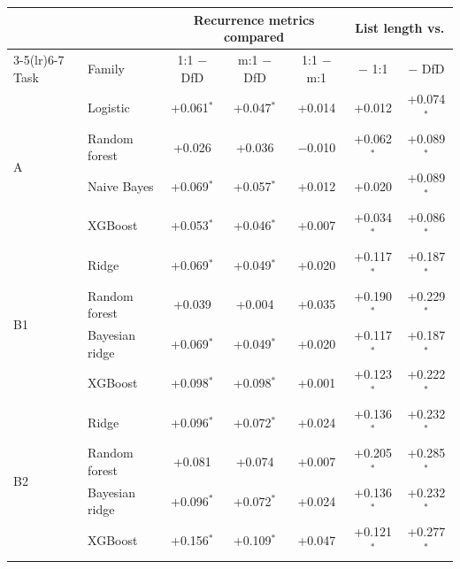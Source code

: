 \begin{tabular}{llccccc}
\toprule
 & & \multicolumn{3}{c}{Recurrence metrics compared} & \multicolumn{2}{c}{List length vs.} \\
\cmidrule(lr){3-5}\cmidrule(lr){6-7}
Task & Family & 1:1 $-$ DfD & m:1 $-$ DfD & 1:1 $-$ m:1 & $-$ 1:1 & $-$ DfD \\
\midrule
\multirow{4}{*}{A} & Logistic & +0.061$^{*}$ & +0.047$^{*}$ & +0.014 & +0.012 & +0.074$^{*}$ \\
 & Random forest & +0.026 & +0.036 & $-$0.010 & +0.062$^{*}$ & +0.089$^{*}$ \\
 & Naive Bayes & +0.069$^{*}$ & +0.057$^{*}$ & +0.012 & +0.020 & +0.089$^{*}$ \\
 & XGBoost & +0.053$^{*}$ & +0.046$^{*}$ & +0.007 & +0.034$^{*}$ & +0.086$^{*}$ \\
\midrule
\multirow{4}{*}{B1} & Ridge & +0.069$^{*}$ & +0.049$^{*}$ & +0.020 & +0.117$^{*}$ & +0.187$^{*}$ \\
 & Random forest & +0.039 & +0.004 & +0.035 & +0.190$^{*}$ & +0.229$^{*}$ \\
 & Bayesian ridge & +0.069$^{*}$ & +0.049$^{*}$ & +0.020 & +0.117$^{*}$ & +0.187$^{*}$ \\
 & XGBoost & +0.098$^{*}$ & +0.098$^{*}$ & +0.001 & +0.123$^{*}$ & +0.222$^{*}$ \\
\midrule
\multirow{4}{*}{B2} & Ridge & +0.096$^{*}$ & +0.072$^{*}$ & +0.024 & +0.136$^{*}$ & +0.232$^{*}$ \\
 & Random forest & +0.081 & +0.074 & +0.007 & +0.205$^{*}$ & +0.285$^{*}$ \\
 & Bayesian ridge & +0.096$^{*}$ & +0.072$^{*}$ & +0.024 & +0.136$^{*}$ & +0.232$^{*}$ \\
 & XGBoost & +0.156$^{*}$ & +0.109$^{*}$ & +0.047 & +0.121$^{*}$ & +0.277$^{*}$ \\

\bottomrule
\end{tabular}